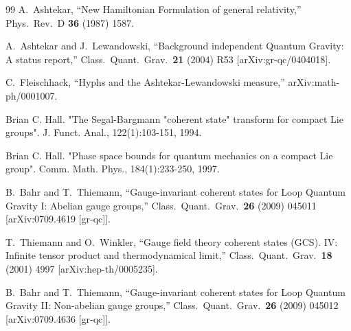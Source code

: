 \documentclass[12pt]{article}
\begin{document}
\begin{thebibliography}{99}
  A.~Ashtekar,
  ``New Hamiltonian Formulation of general relativity,''
  Phys.\ Rev.\  D {\bf 36} (1987) 1587.



  A.~Ashtekar and J.~Lewandowski,
  ``Background independent Quantum Gravity: A status report,''
  Class.\ Quant.\ Grav.\  {\bf 21} (2004) R53
  [arXiv:gr-qc/0404018].


\cite{Fleischhack:2000ij}
  C.~Fleischhack,
  ``Hyphs and the Ashtekar-Lewandowski measure,''
  arXiv:math-ph/0001007.




Brian C. Hall. "The Segal-Bargmann "coherent state" transform for compact Lie groups". J. Funct. Anal., 122(1):103-151, 1994.

Brian C. Hall. "Phase space bounds for quantum mechanics on a compact Lie group". Comm. Math. Phys., 184(1):233-250, 1997.







  B.~Bahr and T.~Thiemann,
  ``Gauge-invariant coherent states for Loop Quantum Gravity I: Abelian gauge
  groups,''
  Class.\ Quant.\ Grav.\  {\bf 26} (2009) 045011
  [arXiv:0709.4619 [gr-qc]].


  T.~Thiemann and O.~Winkler,
  ``Gauge field theory coherent states (GCS). IV: Infinite tensor product  and
  thermodynamical limit,''
  Class.\ Quant.\ Grav.\  {\bf 18} (2001) 4997
  [arXiv:hep-th/0005235].


  B.~Bahr and T.~Thiemann,
  ``Gauge-invariant coherent states for Loop Quantum Gravity II: Non-abelian
  gauge groups,''
  Class.\ Quant.\ Grav.\  {\bf 26} (2009) 045012
  [arXiv:0709.4636 [gr-qc]].









\end{thebibliography}
\end{document}
